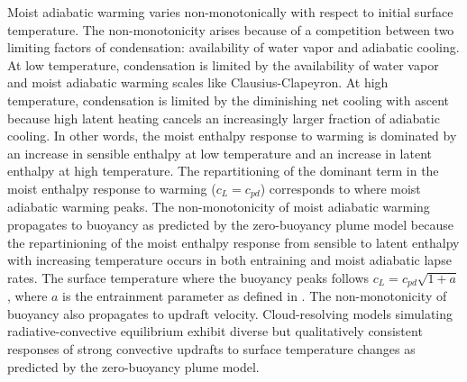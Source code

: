 \documentclass[draft,twocol]{ametsocV6.1}
\begin{document}
Moist adiabatic warming varies non-monotonically with respect to initial surface temperature. The non-monotonicity arises because of a competition between two limiting factors of condensation: availability of water vapor and adiabatic cooling. At low temperature, condensation is limited by the availability of water vapor and moist adiabatic warming scales like Clausius-Clapeyron. At high temperature, condensation is limited by the diminishing net cooling with ascent because high latent heating cancels an increasingly larger fraction of adiabatic cooling. In other words, the moist enthalpy response to warming is dominated by an increase in sensible enthalpy at low temperature and an increase in latent enthalpy at high temperature. The repartitioning of the dominant term in the moist enthalpy response to warming ($c_L=c_{pd}$) corresponds to where moist adiabatic warming peaks. The non-monotonicity of moist adiabatic warming propagates to buoyancy as predicted by the zero-buoyancy plume model because the repartinioning of the moist enthalpy response from sensible to latent enthalpy with increasing temperature occurs in both entraining and moist adiabatic lapse rates. The surface temperature where the buoyancy peaks follows $c_L = c_{pd} \sqrt{1+a}$, where $a$ is the entrainment parameter as defined in \cite{romps2016}. The non-monotonicity of buoyancy also propagates to updraft velocity. Cloud-resolving models simulating radiative-convective equilibrium exhibit diverse but qualitatively consistent responses of strong convective updrafts to surface temperature changes as predicted by the zero-buoyancy plume model.
\end{document}
